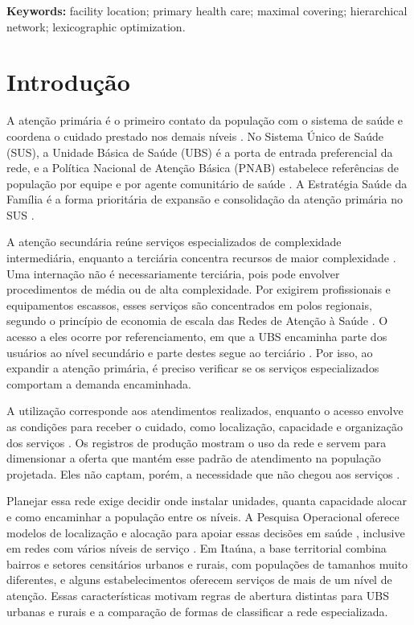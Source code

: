 \documentclass[12pt,a4paper,oneside]{report}
\begin{document}
\noindent\textbf{Keywords:} facility location; primary health care; maximal covering; hierarchical network;
lexicographic optimization.

\FloatBarrier
\clearpage\tableofcontents\clearpage\listoftables\clearpage\listoffigures\clearpage

\chapter{Introdução}

A atenção primária é o primeiro contato da população com o sistema de saúde e coordena o cuidado
prestado nos demais níveis \citep{mendes2010}. No Sistema Único de Saúde (SUS), a Unidade Básica de
Saúde (UBS) é a porta de entrada preferencial da rede, e a Política Nacional de Atenção Básica (PNAB)
estabelece referências de população por equipe e por agente comunitário de saúde \citep{pnab2017}. A
Estratégia Saúde da Família é a forma prioritária de expansão e consolidação da atenção primária no SUS
\citep{pnab2017}.

A atenção secundária reúne serviços especializados de complexidade intermediária, enquanto a
terciária concentra recursos de maior complexidade \citep{mendes2010}. Uma internação não é necessariamente terciária, pois pode envolver procedimentos
de média ou de alta complexidade. Por exigirem
profissionais e equipamentos escassos, esses serviços são concentrados em polos regionais, segundo o
princípio de economia de escala das Redes de Atenção à Saúde \citep{brasil2010}. O acesso a eles ocorre
por referenciamento, em que a UBS encaminha parte dos usuários ao nível secundário e parte destes segue
ao terciário \citep{brasil2011,sahin2007}. Por isso, ao expandir a atenção primária, é preciso verificar se os serviços
especializados comportam a demanda encaminhada.

A utilização corresponde aos atendimentos realizados, enquanto o acesso envolve as condições para
receber o cuidado, como localização, capacidade e organização dos serviços
\citep{aday1974,santana2023}. Os registros de produção mostram o uso da rede e servem para dimensionar a
oferta que mantém esse padrão de atendimento na população projetada. Eles não captam, porém, a
necessidade que não chegou aos serviços \citep{santana2023}.

Planejar essa rede exige decidir onde instalar unidades, quanta capacidade alocar e como encaminhar
a população entre os níveis. A Pesquisa Operacional oferece modelos de localização e alocação para
apoiar essas decisões em saúde
\citep{daskin2004,ahmadi2017}, inclusive em redes com vários níveis de serviço \citep{sahin2007,hodgson1988}. Em
Itaúna, a base territorial combina bairros e setores censitários urbanos e rurais, com
populações de tamanhos muito diferentes, e alguns estabelecimentos oferecem serviços de mais de um nível de atenção. Essas
características motivam regras de abertura distintas para UBS urbanas e rurais e a comparação de formas
de classificar a rede especializada.
\end{document}
